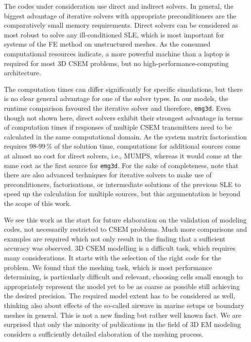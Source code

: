 \documentclass[
    paper,
  ]{geophysics}
\newcommand{\emg}[2]{\texttt{emg#1#2}\xspace}
\begin{document}
The codes under consideration use direct and indirect solvers. In general, the biggest advantage of iterative solvers with appropriate preconditioners are the comparatively small memory requirements.
Direct solvers can be considered as most robust to solve any ill-conditioned SLE, which is most important for systems of the FE method on unstructured meshes.
As the consumed computational resources indicate, a more powerful machine than a laptop is required for most 3D CSEM problems, but no high-performance-computing architecture.

The computation times can differ significantly for specific simulations, but there is no clear general advantage for one of the solver types. 
In our models, the runtime comparison favoured the iterative solver and therefore, \emg3d.
Even though not shown here, direct solvers exhibit their strongest advantage in terms of computation times if responses of multiple CSEM transmitters need to be calculated in the same computational domain.
As the system matrix factorisation requires 98-99\,\% of the solution time, computations for additional sources come at almost no cost for direct solvers, i.e., MUMPS, whereas it would come at the same cost as the first source for \emg3d.
For the sake of completeness, note that there are also advanced techniques for iterative solvers to make use of preconditioners, factorisations, or intermediate solutions of the previous SLE to speed up the calculation for multiple sources, but this argumentation is beyond the scope of this work.

We see this work as the start for future elaboration on the validation of modeling codes, not necessarily restricted to CSEM problems.
Much more comparisons and examples are required which not only result in the finding that a sufficient accuracy was observed. 
3D CSEM modelling is a difficult task, which requires many considerations. It starts with the selection of the right code for the problem. 
We found that the meshing task, which is most performance determining, is particularly difficult and relevant, choosing cells small enough to appropriately represent the model yet to be as coarse as possible still achieving the desired precision.
The required model extent has to be considered as well, thinking also about effects of the so-called airwave in marine setups or boundary meshes in general.
This is not a new finding but rather well known fact.
We are surprised that only the minority of publications in the field of 3D EM modeling considers a sufficiently detailed elaboration of the meshing process.
\end{document}
